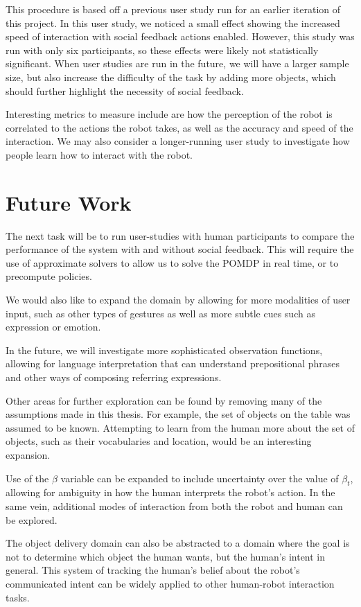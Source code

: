 \documentclass[conference]{IEEEtran}
\begin{document}
This procedure is based off a previous user study run for an earlier iteration of this project. In this user study, we noticed a small effect showing the increased speed of interaction with social feedback actions enabled. However, this study was run with only six participants, so these effects were likely not statistically significant. When user studies are run in the future, we will have a larger sample size, but also increase the difficulty of the task by adding more objects, which should further highlight the necessity of social feedback. 

Interesting metrics to measure include are how the perception of the robot is correlated to the actions the robot takes, as well as the accuracy and speed of the interaction. We may also consider a longer-running user study to investigate how people learn how to interact with the robot. 

\section{Future Work}

The next task will be to run user-studies with human participants to compare the performance of the system with and without social feedback. This will require the use of approximate solvers to allow us to solve the POMDP in real time, or to precompute policies. 

We would also like to expand the domain by allowing for more modalities of user input, such as other types of gestures as well as more subtle cues such as expression or emotion. 

In the future, we will investigate more sophisticated observation functions, allowing for language interpretation that can understand prepositional phrases and other ways of composing referring expressions. 

Other areas for further exploration can be found by removing many of the assumptions made in this thesis. For example, the set of objects on the table was assumed to be known. Attempting to learn from the human more about the set of objects, such as their vocabularies and location, would be an interesting expansion. 

Use of the $\beta$ variable can be expanded to include uncertainty over the value of $\beta_t$, allowing for ambiguity in how the human interprets the robot's action. In the same vein, additional modes of interaction from both the robot and human can be explored. 

The object delivery domain can also be abstracted to a domain where the goal is not to determine which object the human wants, but the human's intent in general. This system of tracking the human's belief about the robot's communicated intent can be widely applied to other human-robot interaction tasks. 
\end{document}
